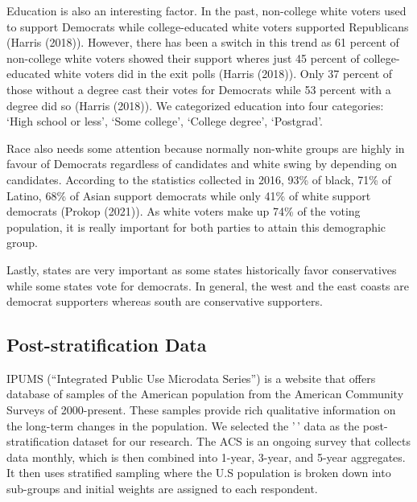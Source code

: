 \documentclass[
  letterpaper,
  DIV=11,
  numbers=noendperiod]{scrartcl}
\begin{document}
Education is also an interesting factor. In the past, non-college white
voters used to support Democrats while college-educated white voters
supported Republicans (Harris (2018)). However, there has been a switch
in this trend as 61 percent of non-college white voters showed their
support wheres just 45 percent of college-educated white voters did in
the exit polls (Harris (2018)). Only 37 percent of those without a
degree cast their votes for Democrats while 53 percent with a degree did
so (Harris (2018)). We categorized education into four categories: `High
school or less', `Some college', `College degree', `Postgrad'.

Race also needs some attention because normally non-white groups are
highly in favour of Democrats regardless of candidates and white swing
by depending on candidates. According to the statistics collected in
2016, 93\% of black, 71\% of Latino, 68\% of Asian support democrats
while only 41\% of white support democrats (Prokop (2021)). As white
voters make up 74\% of the voting population, it is really important for
both parties to attain this demographic group.

Lastly, states are very important as some states historically favor
conservatives while some states vote for democrats. In general, the west
and the east coasts are democrat supporters whereas south are
conservative supporters.

\hypertarget{post-stratification-data}{%
\subsection{Post-stratification Data}\label{post-stratification-data}}

IPUMS (``Integrated Public Use Microdata Series'') is a website that
offers database of samples of the American population from the American
Community Surveys of 2000-present. These samples provide rich
qualitative information on the long-term changes in the population. We
selected the '\,' data as the post-stratification dataset for our
research. The ACS is an ongoing survey that collects data monthly, which
is then combined into 1-year, 3-year, and 5-year aggregates. It then
uses stratified sampling where the U.S population is broken down into
sub-groups and initial weights are assigned to each respondent.
\end{document}
